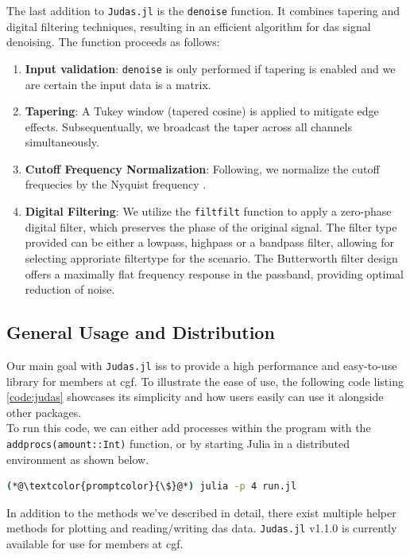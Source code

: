 

The last addition to \texttt{Judas.jl} is the \texttt{denoise} function. It combines tapering and digital filtering techniques, resulting in an efficient algorithm for \acrshort{das} signal denoising. The function proceeds as follows:

\begin{enumerate}
    \item \textbf{Input validation}: \texttt{denoise} is only performed if tapering is enabled and we are certain the input data is a matrix.
    \item \textbf{Tapering}: A Tukey window (tapered cosine) is applied to mitigate edge effects. Subsequentually, we broadcast the taper across all channels simultaneously.
    \item \textbf{Cutoff Frequency Normalization}: Following, we   normalize the cutoff frequecies by the Nyquist frequency \cite{schmogrow2012nyquist}.
    \item \textbf{Digital Filtering}: We utilize the  \texttt{filtfilt} function to apply a zero-phase digital filter, which preserves the phase of the original signal. The filter type provided can be either a lowpass, highpass or a bandpass filter, allowing for selecting approriate filtertype for the scenario. The Butterworth filter design offers a maximally flat frequency response in the passband, providing optimal reduction of noise.
\end{enumerate}

\subsection{General Usage and Distribution}

Our main goal with \texttt{Judas.jl} iss to provide a high performance and easy-to-use library for members at \acrshort{cgf}. To illustrate the ease of use, the following code listing \ref{code:judas} showcases its simplicity and how users easily can use it alongside other packages. \\



To run this code, we can either add processes within the program with the \texttt{addprocs(amount::Int)} function, or by starting Julia in a distributed environment as shown below.

\begin{lstlisting}[style=shellcommand, language=bash, caption=How to run a simple script containing Judas snippets]
(*@\textcolor{promptcolor}{\$}@*) julia -p 4 run.jl
\end{lstlisting}

In addition to the methods we've described in detail, there exist multiple helper methods for plotting and reading/writing \acrshort{das} data. \texttt{Judas.jl} v1.1.0 is currently available for use for members at \acrshort{cgf}. 

